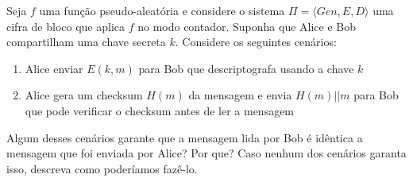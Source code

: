 \begin{exercicio}
  Seja $f$ uma função pseudo-aleatória e considere o sistema $\Pi = \langle Gen, E, D \rangle$ uma cifra de bloco que aplica $f$ no modo contador.
  Suponha que Alice e Bob compartilham uma chave secreta $k$.
  Considere os seguintes cenários:
  \begin{enumerate}
  \item Alice enviar $E(k, m)$ para Bob que descriptografa usando a chave $k$
  \item Alice gera um checksum $H(m)$ da mensagem e envia $H(m)||m$ para Bob que pode verificar o checksum antes de ler a mensagem
  \end{enumerate}
  Algum desses cenários garante que a mensagem lida por Bob é idêntica a mensagem que foi enviada por Alice? Por que? Caso nenhum dos cenários garanta isso, descreva como poderíamos fazê-lo.
\end{exercicio}
